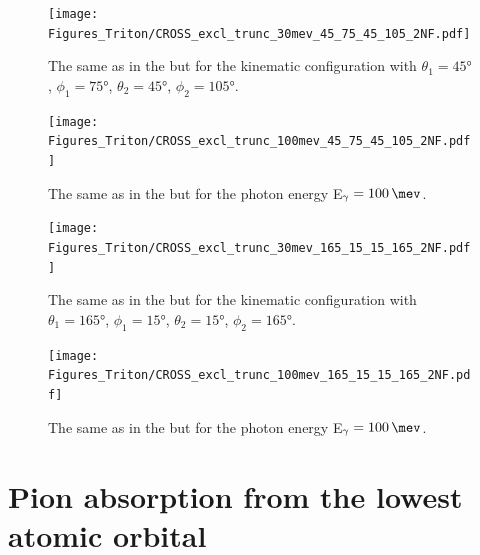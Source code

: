     \begin{figure}[h]
        \begin{center}
            \texttt{[image: Figures\_Triton/CROSS\_excl\_trunc\_30mev\_45\_75\_45\_105\_2NF.pdf]}
            \end{center}
            \caption{The same as in the  but for the kinematic
            configuration with
            $\theta_1 = \ang{45}$, $\phi_1 = \ang{75}$,
            $\theta_2 = \ang{45}$, $\phi_2 = \ang{105}$.}
            \label{CROSS_Triton_EXCL_45_75_45_105}
    \end{figure}


    \begin{figure}[h]
        \begin{center}
            \texttt{[image: Figures\_Triton/CROSS\_excl\_trunc\_100mev\_45\_75\_45\_105\_2NF.pdf]}
            \end{center}
            \caption{The same as in the  but for the photon energy
            E$_\gamma = \SI{100}{\mev}$.}
            \label{CROSS_Triton_EXCL_100mev_45_75_45_105}
    \end{figure}

    \begin{figure}[h]
        \begin{center}
            \texttt{[image: Figures\_Triton/CROSS\_excl\_trunc\_30mev\_165\_15\_15\_165\_2NF.pdf]}
            \end{center}
            \caption{The same as in the  but for the kinematic
            configuration with
            $\theta_1 = \ang{165}$, $\phi_1 = \ang{15}$,
            $\theta_2 = \ang{15}$, $\phi_2 = \ang{165}$.}
            \label{CROSS_Triton_EXCL_165_15_15_165}
    \end{figure}


    \begin{figure}[h]
        \begin{center}
            \texttt{[image: Figures\_Triton/CROSS\_excl\_trunc\_100mev\_165\_15\_15\_165\_2NF.pdf]}
            \end{center}
            \caption{The same as in the  but for the photon energy
            E$_\gamma = \SI{100}{\mev}$.}
            \label{CROSS_Triton_EXCL_100mev_165_15_15_165}
    \end{figure}
        
        
    \clearpage
\section{Pion absorption from the lowest atomic orbital}
\label{sec:pion_results}

